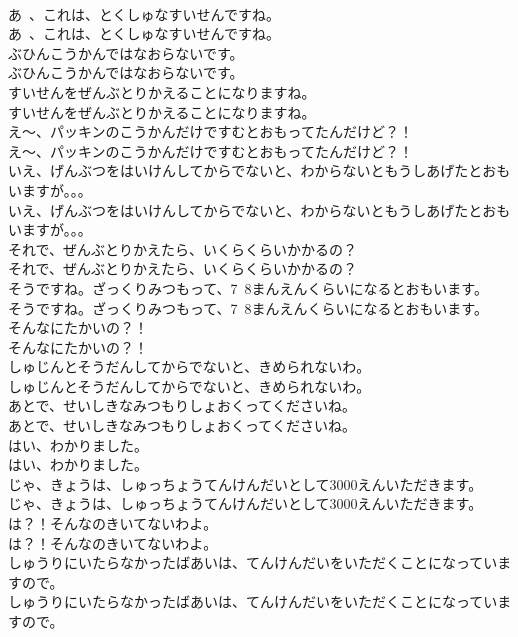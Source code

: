 \documentclass[8pt]{extreport}
\begin{document}
\begin{CJK}{UTF8}{min}
\\	あ~、これは、とくしゅなすいせんですね。
\\	あ~、これは、とくしゅなすいせんですね。
\\	ぶひんこうかんではなおらないです。
\\	ぶひんこうかんではなおらないです。
\\	すいせんをぜんぶとりかえることになりますね。
\\	すいせんをぜんぶとりかえることになりますね。
\\	え～、パッキンのこうかんだけですむとおもってたんだけど？！
\\	え～、パッキンのこうかんだけですむとおもってたんだけど？！
\\	いえ、げんぶつをはいけんしてからでないと、わからないともうしあげたとおもいますが。。。
\\	いえ、げんぶつをはいけんしてからでないと、わからないともうしあげたとおもいますが。。。
\\	それで、ぜんぶとりかえたら、いくらくらいかかるの？
\\	それで、ぜんぶとりかえたら、いくらくらいかかるの？
\\	そうですね。ざっくりみつもって、7~8まんえんくらいになるとおもいます。
\\	そうですね。ざっくりみつもって、7~8まんえんくらいになるとおもいます。
\\	そんなにたかいの？！
\\	そんなにたかいの？！
\\	しゅじんとそうだんしてからでないと、きめられないわ。
\\	しゅじんとそうだんしてからでないと、きめられないわ。
\\	あとで、せいしきなみつもりしょおくってくださいね。
\\	あとで、せいしきなみつもりしょおくってくださいね。
\\	はい、わかりました。
\\	はい、わかりました。
\\	じゃ、きょうは、しゅっちょうてんけんだいとして3000えんいただきます。
\\	じゃ、きょうは、しゅっちょうてんけんだいとして3000えんいただきます。
\\	は？！そんなのきいてないわよ。
\\	は？！そんなのきいてないわよ。
\\	しゅうりにいたらなかったばあいは、てんけんだいをいただくことになっていますので。
\\	しゅうりにいたらなかったばあいは、てんけんだいをいただくことになっていますので。

\end{CJK}
\end{document}

